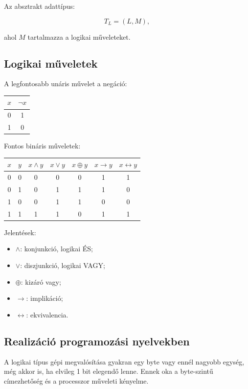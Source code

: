 Az absztrakt adattípus:

\[
T_L=(L,M),
\]

ahol $M$ tartalmazza a logikai műveleteket.

\subsection{Logikai műveletek}

A legfontosabb unáris művelet a negáció:

\begin{center}
\begin{tabular}{c|c}
$x$ & $\neg x$ \\
\midrule
0 & 1 \\
1 & 0 \\
\end{tabular}
\end{center}

Fontos bináris műveletek:

\begin{center}
\begin{tabular}{cc|ccccc}
$x$ & $y$ & $x\land y$ & $x\lor y$ & $x\oplus y$ & $x\to y$ & $x\leftrightarrow y$ \\
\midrule
0 & 0 & 0 & 0 & 0 & 1 & 1 \\
0 & 1 & 0 & 1 & 1 & 1 & 0 \\
1 & 0 & 0 & 1 & 1 & 0 & 0 \\
1 & 1 & 1 & 1 & 0 & 1 & 1 \\
\end{tabular}
\end{center}

Jelentések:

\begin{itemize}
  \item $\land$: konjunkció, logikai ÉS;
  \item $\lor$: diszjunkció, logikai VAGY;
  \item $\oplus$: kizáró vagy;
  \item $\to$: implikáció;
  \item $\leftrightarrow$: ekvivalencia.
\end{itemize}

\subsection{Realizáció programozási nyelvekben}

A logikai típus gépi megvalósítása gyakran egy byte vagy ennél nagyobb egység, még akkor is, ha elvileg 1 bit elegendő lenne. Ennek oka a byte-szintű címezhetőség és a processzor műveleti kényelme.

